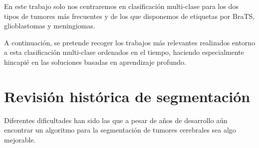 En este trabajo solo nos centraremos en clasificación multi-clase para los dos tipos de tumores más frecuentes y de los que disponemos de etiquetas por BraTS, glioblastomas y meningiomas.

A continuación, se pretende recoger los trabajos más relevantes realizados entorno a esta clasificación multi-clase ordenados en el tiempo, haciendo especialmente hincapié en las soluciones basadas en aprendizaje profundo. 

\section{Revisión histórica de segmentación}

Diferentes dificultades han sido las que a pesar de años de desarrollo aún encontrar un algoritmo para la segmentación de tumores cerebrales sea algo mejorable. 

